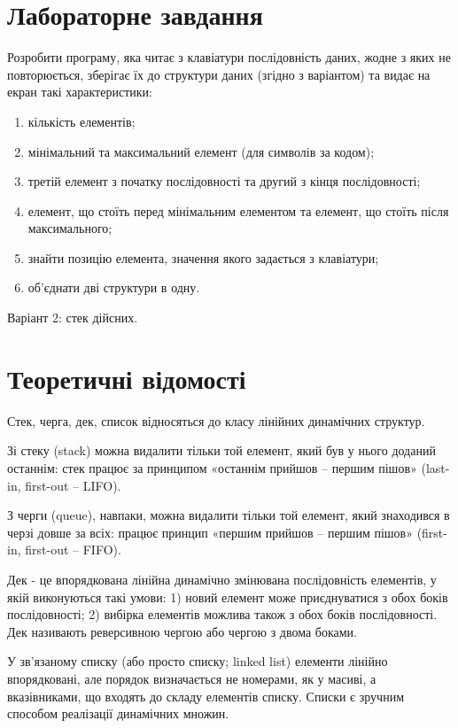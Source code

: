 \documentclass{article}
\begin{document}
\begin{normalsize}
		\section*{Лабораторне завдання}

	Розробити програму, яка читає з клавіатури послідовність даних, жодне з яких не повторюється, зберігає їх до структури даних (згідно з варіантом) та видає на екран такі характеристики: 
		\begin{center}
			\begin{enumerate}
				\item кількість елементів;
				\item мінімальний та максимальний елемент (для символів за кодом);
				\item третій елемент з початку послідовності та другий з кінця послідовності;
				\item елемент, що стоїть перед мінімальним елементом та елемент, що стоїть після максимального;
				\item знайти позицію елемента, значення якого задається з клавіатури;
				\item об'єднати дві структури в одну.
			\end{enumerate}
		Варіант 2: стек дійсних. 
		\end{center}
		
		\section*{Теоретичні відомості}
		Стек, черга, дек, список відносяться до класу лінійних динамічних структур.
		
		Зі стеку (stack) можна видалити тільки той елемент, який був у нього доданий останнім: стек працює за принципом «останнім прийшов – першим пішов» (last-in, first-out – LIFO).
		
		З черги (queue), навпаки, можна видалити тільки той елемент, який знаходився в черзі довше за всіх: працює принцип «першим прийшов – першим пішов» (first-in, first-out – FIFO).
		
		Дек - це впорядкована лінійна динамічно змінювана послідовність елементів, у якій виконуються такі умови: 1) новий елемент може приєднуватися з обох боків послідовності; 2) вибірка елементів можлива також з обох боків послідовності. Дек називають реверсивною чергою або чергою з двома боками.
		
		У зв’язаному списку (або просто списку; linked list) елементи лінійно впорядковані, але порядок визначається не номерами, як у масиві, а вказівниками, що входять до складу елементів списку. Списки є зручним способом реалізації динамічних множин.
		

\end{normalsize}
\end{document}
